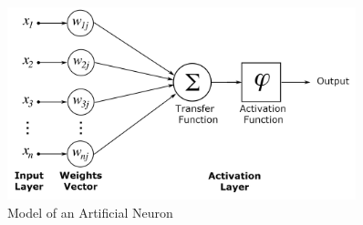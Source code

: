 \documentclass[12pt,oneside]{CUNY_CS_PhD}
\begin{document}
\begin{figure}[!htbp]
\centering
\includegraphics[width=0.9\textwidth]{pictures/ArtificialNeuronModel.png}
\caption{Model of an Artificial Neuron}
\label{fig:neuron}
\end{figure}
\end{document}
